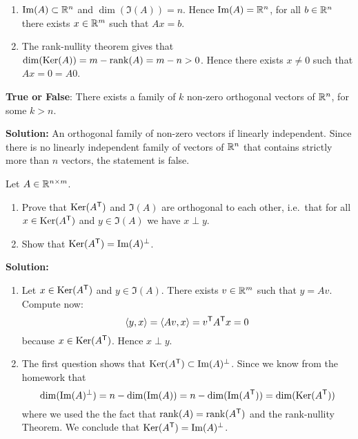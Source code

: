 \documentclass[11pt,nocut]{article}
\begin{document}
	\begin{enumerate}
		\item ${{\rm Im}}(A) \subset \mathbb{R}^n$ and $\dim(\Im(A)) = n$. Hence ${{\rm Im}}(A) = \mathbb{R}^n$, for all $b \in \mathbb{R}^n$ there exists $x \in \mathbb{R}^m$ such that $Ax=b$.
		\item The rank-nullity theorem gives that ${{\rm dim}}({{\rm Ker}}(A)) = m - {{\rm rank}}(A) = m-n > 0$. Hence there exists $x \neq 0$ such that $Ax=0=A0$.
	\end{enumerate}

\vspace{0.2cm}
\begin{problem}
	\textbf{True or False}: There exists a family of $k$ non-zero orthogonal vectors of $\mathbb{R}^n$, for some $k>n$.
\end{problem}

\textbf{Solution:}
An orthogonal family of non-zero vectors if linearly independent. Since there is no linearly independent family of vectors of $\mathbb{R}^n$ that contains strictly more than $n$ vectors, the statement is false.

\vspace{0.2cm}

\begin{problem}
	Let $A \in \mathbb{R}^{n \times m}$.
	\begin{enumerate}
		\item Prove that ${{\rm Ker}}(A^{{\sf T}})$ and $\Im(A)$ are orthogonal to each other, i.e.\ that for all $x \in {{\rm Ker}}(A^{{\sf T}})$ and $y \in \Im(A)$ we have $x \perp y$.
		\item Show that ${{\rm Ker}}(A^{{\sf T}}) = {{\rm Im}}(A)^{\perp}$.
	\end{enumerate}
\end{problem}

\textbf{Solution:}
	\begin{enumerate}
		\item Let $x \in {{\rm Ker}}(A^{{\sf T}})$ and $y \in \Im(A)$. There exists $v \in \mathbb{R}^m$ such that $y = Av$. Compute now:
			$$
			\langle y,x \rangle = 
			\langle Av,x \rangle = 
			v^{{\sf T}} A^{{\sf T}} x = 0
			$$
			because $x \in {{\rm Ker}}(A^{{\sf T}})$. Hence $x \perp y$.
		\item The first question shows that ${{\rm Ker}}(A^{{\sf T}}) \subset {{\rm Im}}(A)^{\perp}$. Since we know from the homework that 
			$$
			{{\rm dim}}({{\rm Im}}(A)^{\perp}) = n - {{\rm dim}}({{\rm Im}}(A)) = n - {{\rm dim}}({{\rm Im}}(A^{{\sf T}}))
			= {{\rm dim}}({{\rm Ker}}(A^{{\sf T}}))
			$$
			where we used the the fact that ${{\rm rank}}(A) = {{\rm rank}}(A^{{\sf T}})$ and the rank-nullity Theorem. We conclude that ${{\rm Ker}}(A^{{\sf T}}) = {{\rm Im}}(A)^{\perp}$.
	\end{enumerate}
\end{document}

